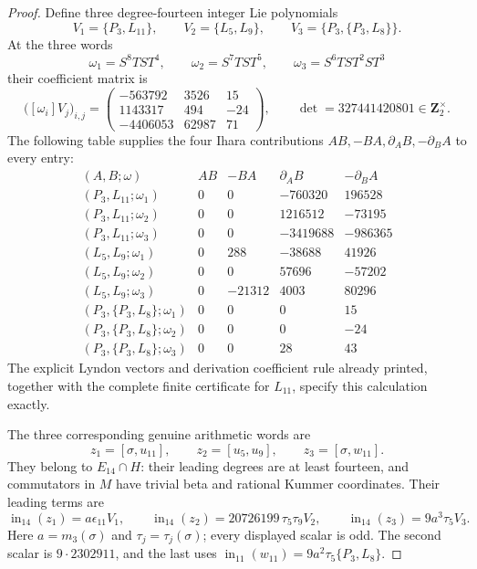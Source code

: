 \begin{proof}
Define three degree-fourteen integer Lie polynomials
\[
 V_1=\{P_3,L_{11}\},\qquad
 V_2=\{L_5,L_9\},\qquad
 V_3=\{P_3,\{P_3,L_8\}\}.
\]
At the three words
\[
 \omega_1=S^8TST^4,\qquad
 \omega_2=S^7TST^5,\qquad
 \omega_3=S^6TST^2ST^3
\]
their coefficient matrix is
\begin{equation}\label{eq:fr-fourteen-unit-minor}
 \bigl([\omega_i]V_j\bigr)_{i,j}
 =
 \begin{pmatrix}
 -563792&3526&15\\
 1143317&494&-24\\
 -4406053&62987&71
 \end{pmatrix},
 \qquad \det=327441420801\in\mathbf Z_2^\times.
\end{equation}
The following table supplies the four Ihara contributions
$AB,-BA,\partial_A B,-\partial_B A$ to every entry:
\[
\begin{array}{c|r|r|r|r}
(A,B;\omega)&AB&-BA&\partial_A B&-\partial_B A\\\hline
(P_3,L_{11};\omega_1)&0&0&-760320&196528\\
(P_3,L_{11};\omega_2)&0&0&1216512&-73195\\
(P_3,L_{11};\omega_3)&0&0&-3419688&-986365\\
(L_5,L_9;\omega_1)&0&288&-38688&41926\\
(L_5,L_9;\omega_2)&0&0&57696&-57202\\
(L_5,L_9;\omega_3)&0&-21312&4003&80296\\
(P_3,\{P_3,L_8\};\omega_1)&0&0&0&15\\
(P_3,\{P_3,L_8\};\omega_2)&0&0&0&-24\\
(P_3,\{P_3,L_8\};\omega_3)&0&0&28&43
\end{array}
\]
The explicit Lyndon vectors and derivation coefficient rule
already printed, together with the complete finite certificate
for $L_{11}$, specify this calculation exactly.

The three corresponding genuine arithmetic words are
\[
 z_1=[\sigma,u_{11}],\qquad
 z_2=[u_5,u_9],\qquad
 z_3=[\sigma,w_{11}].
\]
They belong to $E_{14}\cap H$: their leading degrees are at
least fourteen, and commutators in $M$ have trivial beta and
rational Kummer coordinates. Their leading terms are
\[
 \operatorname{in}_{14}(z_1)=a\epsilon_{11}V_1,\qquad
 \operatorname{in}_{14}(z_2)=20726199\,\tau_5\tau_9V_2,
 \qquad
 \operatorname{in}_{14}(z_3)=9a^3\tau_5V_3.
\]
Here $a=m_3(\sigma)$ and $\tau_j=\tau_j(\sigma)$; every
displayed scalar is odd. The second scalar is
$9\cdot2302911$, and the last uses
$\operatorname{in}_{11}(w_{11})=9a^2\tau_5\{P_3,L_8\}$.


\end{proof}
